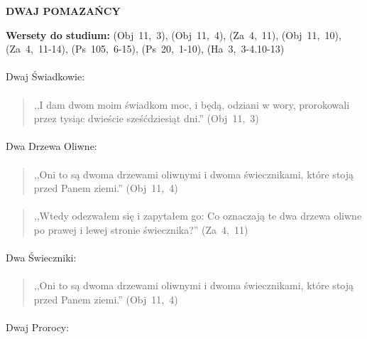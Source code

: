 \documentclass[10pt,a4paper,oneside]{article}
\begin{document}
\centerline{\textbf{\MakeUppercase{Dwaj Pomazańcy}}}
\begin{center}
\textbf{Wersety do studium:} 
\mbox{(Obj 11, 3)}, \mbox{(Obj 11, 4)}, \mbox{(Za 4, 11)}, \mbox{(Obj 11, 10)}, \mbox{(Za 4, 11-14)}, \mbox{(Ps 105, 6-15)}, \mbox{(Ps 20, 1-10)}, \mbox{(Ha 3, 3-4.10-13)}
\end{center}
\paragraph{}
Dwaj Świadkowie:
\paragraph{}
\begin{quote}
,,I dam dwom moim świadkom moc, i będą, odziani w wory, prorokowali przez tysiąc dwieście sześćdziesiąt dni.'' \mbox{(Obj 11, 3)}
\end{quote}
\paragraph{}
Dwa Drzewa Oliwne:
\paragraph{}
\begin{quote}
,,Oni to są dwoma drzewami oliwnymi i dwoma świecznikami, które stoją przed Panem ziemi.'' \mbox{(Obj 11, 4)}
\end{quote}
\paragraph{}
\begin{quote}
,,Wtedy odezwałem się i zapytałem go: Co oznaczają te dwa drzewa oliwne po prawej i lewej stronie świecznika?'' \mbox{(Za 4, 11)}
\end{quote}
\paragraph{}
Dwa Świeczniki:
\paragraph{}
\begin{quote}
,,Oni to są dwoma drzewami oliwnymi i dwoma świecznikami, które stoją przed Panem ziemi.'' \mbox{(Obj 11, 4)}
\end{quote}
\paragraph{}
Dwaj Prorocy:
\end{document}
